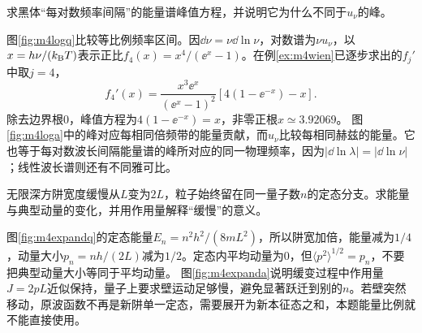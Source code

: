 \begin{exercise}\label{ex:m4spectralpeak}
求黑体“每对数频率间隔”的能量谱峰值方程，并说明它为什么不同于$u_\nu$的峰。
\end{exercise}
\begin{solution}
图\ref{fig:m4logq}比较等比例频率区间。因$\dd\nu=\nu\dd\ln\nu$，对数谱为$\nu u_\nu$，以$x=h\nu/(k_{\mathrm B} T)$表示正比$f_4(x)=x^4/(\ee^x-1)$。在例\ref{ex:m4wien}已逐步求出的$f_j'$中取$j=4$，
\[
 f_4'(x)=\frac{x^3\ee^x}{(\ee^x-1)^2}
 [4(1-\ee^{-x})-x].
\]
除去边界根$0$，峰值方程为$4(1-\ee^{-x})=x$，非零正根$x\simeq3.92069$。
图\ref{fig:m4loga}中的峰对应每相同倍频带的能量贡献，而$u_\nu$比较每相同赫兹的能量。它也等于每对数波长间隔能量谱的峰所对应的同一物理频率，因为$|\dd\ln\lambda|=|\dd\ln\nu|$；线性波长谱则还有不同雅可比。
\end{solution}

\begin{exercise}\label{ex:m4welltransition}
无限深方阱宽度缓慢从$L$变为$2L$，粒子始终留在同一量子数$n$的定态分支。求能量与典型动量的变化，并用作用量解释“缓慢”的意义。
\end{exercise}
\begin{solution}
图\ref{fig:m4expandq}的定态能量$E_n=n^2h^2/(8mL^2)$，所以阱宽加倍，能量减为$1/4$，动量大小$p_n=nh/(2L)$减为$1/2$。定态内平均动量为0，但$\langle p^2\rangle^{1/2}=p_n$，不要把典型动量大小等同于平均动量。
图\ref{fig:m4expanda}说明缓变过程中作用量$J=2pL$近似保持，量子上要求壁运动足够慢，避免显著跃迁到别的$n$。若壁突然移动，原波函数不再是新阱单一定态，需要展开为新本征态之和，本题能量比例就不能直接使用。
\end{solution}


